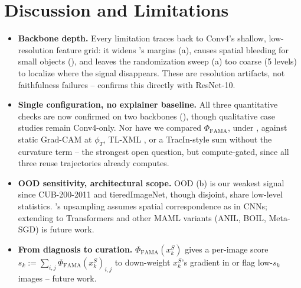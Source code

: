 \section{Discussion and Limitations}
\label{sec:limitations}

\begin{itemize}[leftmargin=*,itemsep=2pt,topsep=2pt]
\item \textbf{Backbone depth.} Every limitation traces back to Conv4's shallow, low-resolution feature grid: it widens \biadt's margins (a), causes spatial bleeding for small objects (), and leaves the randomization sweep (a) too coarse (5 levels) to localize where the signal disappears. These are resolution artifacts, not faithfulness failures --  confirms this directly with ResNet-10.

\item \textbf{Single configuration, no explainer baseline.} All three quantitative checks are now confirmed on two backbones (), though qualitative case studies remain Conv4-only. Nor have we compared $\Phi_{\mathrm{FAMA}}$, under \biadt, against static Grad-CAM at $\phi_T$, TL-XML \citep{mitsuka2025tlxml}, or a TracIn-style \citep{pruthi2020estimating} sum without the curvature term -- the strongest open question, but compute-gated, since all three reuse trajectories \fama already computes.

\item \textbf{OOD sensitivity, architectural scope.} OOD (b) is our weakest signal since CUB-200-2011 and tieredImageNet, though disjoint, share low-level statistics. \fama's upsampling assumes spatial correspondence as in CNNs; extending to Transformers and other MAML variants (ANIL, BOIL, Meta-SGD) is future work.

\item \textbf{From diagnosis to curation.} $\Phi_{\mathrm{FAMA}}(x_k^S)$ gives a per-image score $s_k := \sum_{i,j}\Phi_{\mathrm{FAMA}}(x_k^S)_{i,j}$ to down-weight $x_k^S$'s gradient in  or flag low-$s_k$ images -- future work.
\end{itemize}
